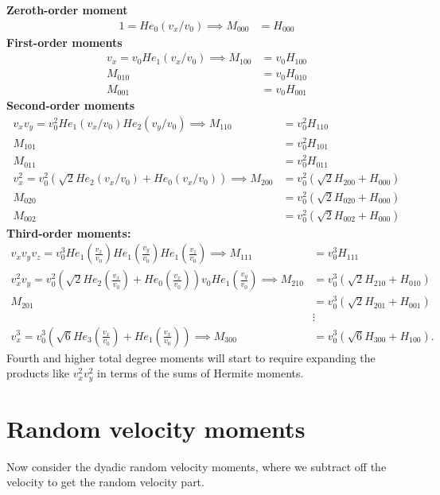 \documentclass{article}
\begin{document}
\textbf{Zeroth-order moment}
\begin{align*}
    1 = He_0(v_x/v_0) \implies M_{000} &= H_{000}
\end{align*}
\textbf{First-order moments}
\begin{align*}
    v_x = v_0 He_1(v_x/v_0) \implies M_{100} &= v_0 H_{100} \\
    M_{010} &= v_0 H_{010} \\
    M_{001} &= v_0 H_{001}
\end{align*}
\textbf{Second-order moments}
\begin{align*}
    v_x v_y = v_0^2 He_1(v_x/v_0) He_2(v_y/v_0) \implies M_{110} &= v_0^2 H_{110} \\
    M_{101} &= v_0^2 H_{101} \\
    M_{011} &= v_0^2 H_{011} \\
    v_x^2 = v_0^2 (\sqrt{2} He_2(v_x/v_0) + He_0(v_x/v_0)) \implies M_{200} &= v_0^2 (\sqrt{2} H_{200} + H_{000}) \\
    M_{020} &= v_0^2 (\sqrt{2} H_{020} + H_{000}) \\
    M_{002} &= v_0^2 (\sqrt{2} H_{002} + H_{000})
\end{align*}
\textbf{Third-order moments:}
\begin{align*}
    v_x v_y v_z = v_0^3 He_1\left(\frac{v_x}{v_0}\right) He_1\left(\frac{v_y}{v_0}\right) He_1\left(\frac{v_z}{v_0}\right) \implies M_{111} &= v_0^3 H_{111} \\
    v_x^2 v_y = v_0^2 \left(\sqrt{2} He_2\left(\frac{v_x}{v_0}\right) + He_0\left(\frac{v_x}{v_0}\right)\right) v_0 He_1 \left( \frac{v_y}{v_0} \right)  \implies M_{210} &= v_0^3 (\sqrt{2} H_{210} + H_{010}) \\
    M_{201} &= v_0^3 (\sqrt{2} H_{201} + H_{001}) \\
            &\vdots \\
    v_x^3 = v_0^3 \left( \sqrt{6} He_3 \left( \frac{v_x}{v_0} \right) + He_1 \left( \frac{v_x}{v_0} \right) \right) \implies M_{300} &= v_0^3 (\sqrt{6} H_{300} + H_{100}).
\end{align*}
Fourth and higher total degree moments will start to require expanding the products like $v_x^2 v_y^2$
in terms of the sums of Hermite moments.

\section{Random velocity moments}
Now consider the dyadic random velocity moments, where we subtract off the velocity to get the random velocity part.
\end{document}

